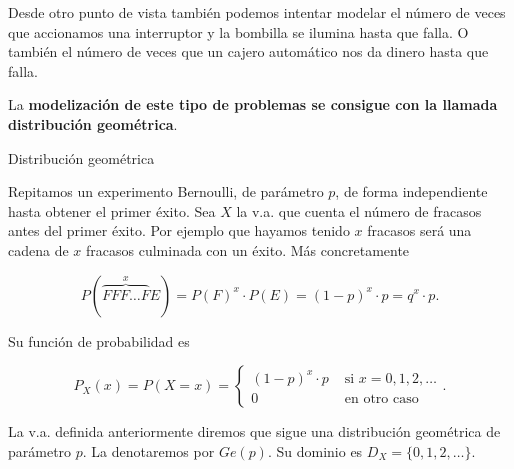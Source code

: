 \documentclass[
  letterpaper,
  DIV=11,
  numbers=noendperiod]{scrreprt}
\begin{document}
Desde otro punto de vista también podemos intentar modelar el número de
veces que accionamos una interruptor y la bombilla se ilumina hasta que
falla. O también el número de veces que un cajero automático nos da
dinero hasta que falla.

La \textbf{modelización de este tipo de problemas se consigue con la
llamada distribución geométrica}.

\begin{Definicion}{Distribución geométrica}{}

Repitamos un experimento Bernoulli, de parámetro \(p\), de forma
independiente hasta obtener el primer éxito. Sea \(X\) la v.a. que
cuenta el número de fracasos antes del primer éxito. Por ejemplo que
hayamos tenido \(x\) fracasos será una cadena de \(x\) fracasos
culminada con un éxito. Más concretamente

\[P(\overbrace{FFF\ldots F}^{x}E)=P(F)^{x}\cdot P(E)=(1-p)^{x}\cdot p=q^{x}\cdot p.\]

Su función de probabilidad es

\[
P_X(x)=P(X=x)=\left\{\begin{array}{ll}
(1-p)^{x}\cdot p & \mbox{ si } x=0,1,2,\ldots\\
0 &\mbox{ en otro caso}
\end{array}\right..
\]

La v.a. definida anteriormente diremos que sigue una distribución
geométrica de parámetro \(p\). La denotaremos por \(Ge(p)\). Su dominio
es \(D_X=\{0,1,2,\ldots\}\).

\end{Definicion}
\end{document}
